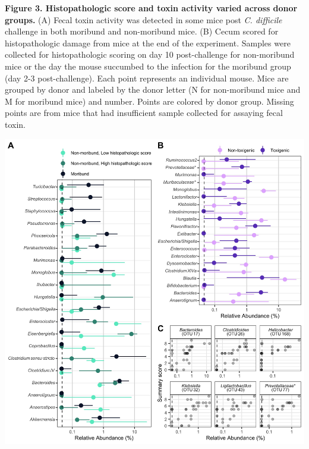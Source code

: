 \documentclass[
  12pt,
]{article}
\begin{document}
\textbf{Figure 3. Histopathologic score and toxin activity varied across
donor groups.} (A) Fecal toxin activity was detected in some mice post
\emph{C. difficile} challenge in both moribund and non-moribund mice.
(B) Cecum scored for histopathologic damage from mice at the end of the
experiment. Samples were collected for histopathologic scoring on day 10
post-challenge for non-moribund mice or the day the mouse succumbed to
the infection for the moribund group (day 2-3 post-challenge). Each
point represents an individual mouse. Mice are grouped by donor and
labeled by the donor letter (N for non-moribund mice and M for moribund
mice) and number. Points are colored by donor group. Missing points are
from mice that had insufficient sample collected for assaying fecal
toxin.

\hfill\break

\includegraphics{../results/figures/figure_4.jpg}
\end{document}
